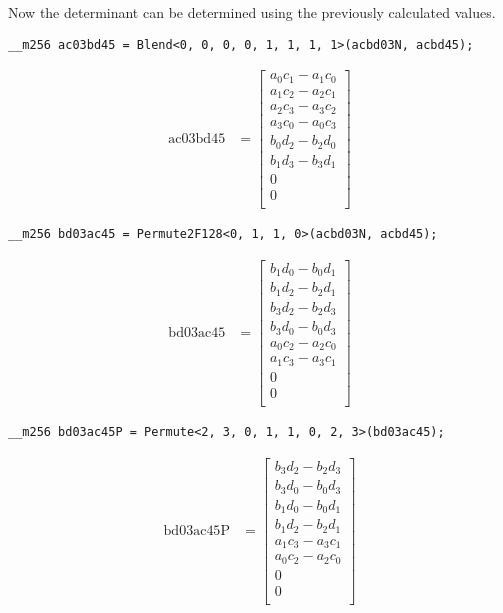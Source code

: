 Now the determinant can be determined using the previously calculated values.

\begin{verbatim}
__m256 ac03bd45 = Blend<0, 0, 0, 0, 1, 1, 1, 1>(acbd03N, acbd45);
\end{verbatim}
\begin{align*}
\mathrm{ac03bd45} 
&=
\begin{bmatrix}
a_0c_1 - a_1c_0\\
a_1c_2 - a_2c_1\\
a_2c_3 - a_3c_2\\
a_3c_0 - a_0c_3\\
b_0d_2 - b_2d_0\\
b_1d_3 - b_3d_1\\
0\\
0\\
\end{bmatrix}
\end{align*}

\begin{verbatim}
__m256 bd03ac45 = Permute2F128<0, 1, 1, 0>(acbd03N, acbd45);
\end{verbatim}
\begin{align*}
\mathrm{bd03ac45} 
&=
\begin{bmatrix}
b_1d_0 - b_0d_1\\
b_1d_2 - b_2d_1\\
b_3d_2 - b_2d_3\\
b_3d_0 - b_0d_3\\
a_0c_2 - a_2c_0\\
a_1c_3 - a_3c_1\\
0\\
0\\
\end{bmatrix}
\end{align*}

\begin{verbatim}
__m256 bd03ac45P = Permute<2, 3, 0, 1, 1, 0, 2, 3>(bd03ac45);
\end{verbatim}
\begin{align*}
\mathrm{bd03ac45P} 
&=
\begin{bmatrix}
b_3d_2 - b_2d_3\\
b_3d_0 - b_0d_3\\
b_1d_0 - b_0d_1\\
b_1d_2 - b_2d_1\\
a_1c_3 - a_3c_1\\
a_0c_2 - a_2c_0\\
0\\
0\\
\end{bmatrix}
\end{align*}

